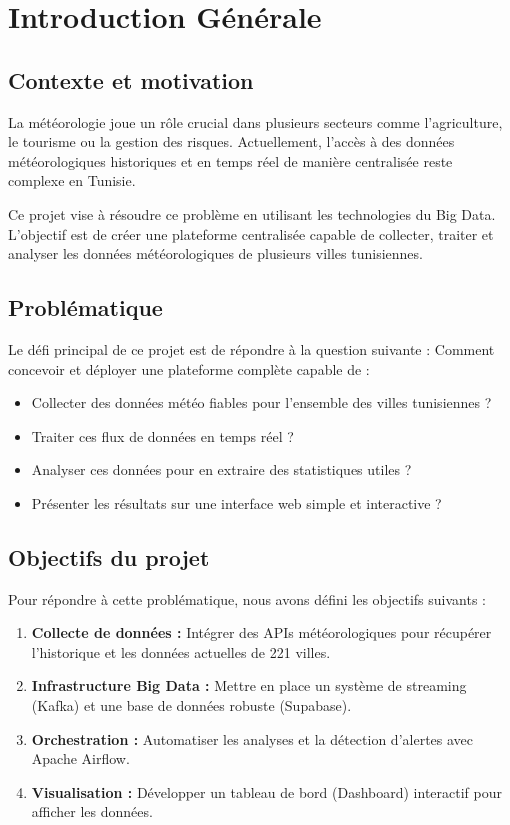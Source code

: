 \chapter{Introduction Générale}

\section{Contexte et motivation}
La météorologie joue un rôle crucial dans plusieurs secteurs comme l'agriculture, le tourisme ou la gestion des risques. Actuellement, l'accès à des données météorologiques historiques et en temps réel de manière centralisée reste complexe en Tunisie.

Ce projet vise à résoudre ce problème en utilisant les technologies du Big Data. L'objectif est de créer une plateforme centralisée capable de collecter, traiter et analyser les données météorologiques de plusieurs villes tunisiennes.

\section{Problématique}
Le défi principal de ce projet est de répondre à la question suivante :
Comment concevoir et déployer une plateforme complète capable de :
\begin{itemize}
  \item Collecter des données météo fiables pour l'ensemble des villes tunisiennes ?
  \item Traiter ces flux de données en temps réel ?
  \item Analyser ces données pour en extraire des statistiques utiles ?
  \item Présenter les résultats sur une interface web simple et interactive ?
\end{itemize}

\section{Objectifs du projet}
Pour répondre à cette problématique, nous avons défini les objectifs suivants :
\begin{enumerate}
  \item \textbf{Collecte de données :} Intégrer des APIs météorologiques pour récupérer l'historique et les données actuelles de 221 villes.
  \item \textbf{Infrastructure Big Data :} Mettre en place un système de streaming (Kafka) et une base de données robuste (Supabase).
  \item \textbf{Orchestration :} Automatiser les analyses et la détection d'alertes avec Apache Airflow.
  \item \textbf{Visualisation :} Développer un tableau de bord (Dashboard) interactif pour afficher les données.
\end{enumerate}

